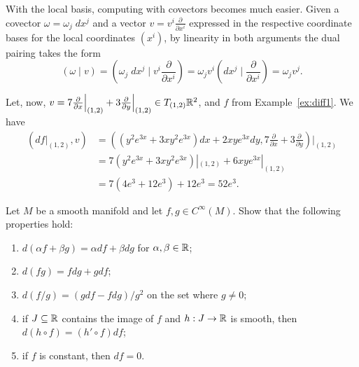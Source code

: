 With the local basis, computing with covectors becomes much easier.
Given a covector $\omega = \omega_j\; dx^j$ and a vector $v = v^i \frac{\partial}{\partial x^i}$ expressed in the respective coordinate bases for the local coordinates $(x^i)$, by linearity in both arguments the dual pairing takes the form
\begin{equation}\label{eq:localdualpairing}
  (\omega \mid v) =
  \left(\omega_j\; dx^j \;\Big |\; v^i \frac{\partial}{\partial x^i} \right) =
  \omega_j v^i \left(dx^j \;\Big |\; \frac{\partial}{\partial x^i} \right) =
  \omega_j v^j.
\end{equation}

\begin{example}
  Let, now, $v = 7 \frac{\partial}{\partial x}\Big|_{(1,2)} + 3 \frac{\partial}{\partial y}\Big|_{(1,2)}\in T_{(1,2)}\mathbb{R}^2$, and $f$ from Example~\ref{ex:diff1}.
  We have
  \begin{align}
    (df|_{(1,2)}, v)
     & = \left((y^2 e^{3x} +3xy^2 e^{3x}) dx + 2xy e^{3x} dy, 7 \frac{\partial}{\partial x} + 3 \frac{\partial}{\partial y} \right)\Big|_{(1,2)} \\
     & = 7(y^2 e^{3x} +3xy^2 e^{3x})|_{(1,2)} + 6 xy e^{3x}|_{(1,2)}                                                                             \\
     & = 7(4 e^3 + 12 e^3) + 12 e^3 = 52e^3.
  \end{align}
\end{example}

\begin{exercise}
  Let $M$ be a smooth manifold and let $f,g\in C^\infty(M)$. Show that the following properties hold:
  \begin{enumerate}
    \item $d(\alpha f + \beta g) = \alpha df + \beta dg$ for $\alpha,\beta\in\mathbb{R}$;
    \item $d(fg) = f dg + g df$;
    \item $d(f/g) = (g df - f dg)/g^2$ on the set where $g\neq 0$;
    \item if $J\subseteq\mathbb{R}$ contains the image of $f$ and $h:J\to\mathbb{R}$ is smooth, then $d(h\circ f) = (h'\circ f) df$;
    \item if $f$ is constant, then $df= 0$.
  \end{enumerate}
\end{exercise}

